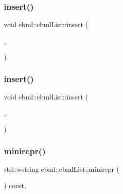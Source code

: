 \mbox{\label{classebml_1_1ebmlList_abc0424061c7edb3ecdfd5169f7de7288}} 
\subsubsection{\texorpdfstring{insert()}{insert()}\hspace{0.1cm}{\footnotesize\ttfamily [1/2]}}
{\footnotesize\ttfamily void ebml\+::ebml\+List\+::insert (\begin{DoxyParamCaption}\item[{off\+\_\+t}]{,  }\item[{const \mbox{\hyperlink{namespaceebml_adad533b7705a16bb360fe56380c5e7be}{ebml\+Element\+\_\+sp}} \&}]{ }\end{DoxyParamCaption})}

\mbox{\label{classebml_1_1ebmlList_a7dc291c779b8e3e389a68caf8266ebf3}} 
\subsubsection{\texorpdfstring{insert()}{insert()}\hspace{0.1cm}{\footnotesize\ttfamily [2/2]}}
{\footnotesize\ttfamily void ebml\+::ebml\+List\+::insert (\begin{DoxyParamCaption}\item[{off\+\_\+t}]{,  }\item[{\mbox{\hyperlink{namespaceebml_adad533b7705a16bb360fe56380c5e7be}{ebml\+Element\+\_\+sp}} \&\&}]{ }\end{DoxyParamCaption})}

\mbox{\label{classebml_1_1ebmlList_a49cf343c62058b121e7c546e8afa0947}} 
\subsubsection{\texorpdfstring{minirepr()}{minirepr()}}
{\footnotesize\ttfamily std\+::wstring ebml\+::ebml\+List\+::minirepr (\begin{DoxyParamCaption}{ }\end{DoxyParamCaption}) const\hspace{0.3cm}{\ttfamily [override]}, {\ttfamily [virtual]}}



